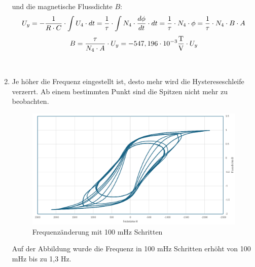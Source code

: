 \documentclass[a4paper,twoside,12pt,DIV=13,BCOR=5mm,numbers=noenddot,cleardoublepage=empty]{scrbook}
\begin{document}
\begin{enumerate}
                und die magnetische Flussdichte $B$:
                \begin{equation}
                    U_y = -\frac{1}{R \cdot C} \cdot \int U_4 \cdot dt \\
                    = \frac{1}{\tau} \cdot \int N_4 \cdot \frac{d\phi}{dt} \cdot dt \\
                    = \frac{1}{\tau} \cdot N_4 \cdot \phi \\
                    = \frac{1}{\tau} \cdot N_4 \cdot B \cdot A \\
                \end{equation}
                \begin{equation}
                    B = \frac{\tau}{N_4 \cdot A} \cdot U_y \\
                    = -547,196 \cdot 10^{-3} \frac{\text{T}}{\text{V}} \cdot U_y
                \end{equation}

            \\

            \newpage
            \item Je höher die Frequenz eingestellt ist, desto mehr wird die Hystereseschleife verzerrt. Ab einem bestimmten Punkt sind die Spitzen nicht mehr zu beobachten.

            \begin{figure}[h] 
            \centering
            \includegraphics[width=\textwidth]{pictures/freqAnderung.png} 
            \caption{Frequenzänderung mit 100 mHz Schritten}
            \label{fig:meinbild}
            \end{figure}

            Auf der Abbildung wurde die Frequenz in 100 mHz Schritten erhöht von 100 mHz bis zu 1,3 Hz.
            

\end{enumerate}
\end{document}
